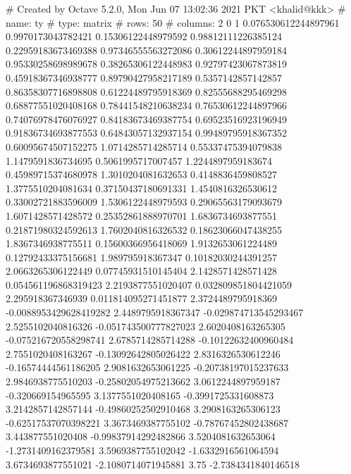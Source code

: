 # Created by Octave 5.2.0, Mon Jun 07 13:02:36 2021 PKT <khalid@kkk>
# name: ty
# type: matrix
# rows: 50
# columns: 2
 0 1
 0.076530612244897961 0.9970173043782421
 0.15306122448979592 0.98812111226385124
 0.22959183673469388 0.97346555563272086
 0.30612244897959184 0.95330258698989678
 0.38265306122448983 0.92797423067873819
 0.45918367346938777 0.89790427958217189
 0.5357142857142857 0.86358307716898808
 0.61224489795918369 0.82555688295469298
 0.68877551020408168 0.78441548210638234
 0.76530612244897966 0.74076978476076927
 0.84183673469387754 0.69523516923196949
 0.91836734693877553 0.64843057132937154
 0.99489795918367352 0.60095674507152275
 1.0714285714285714 0.55337475394079838
 1.1479591836734695 0.5061995717007457
 1.2244897959183674 0.45989715374680978
 1.3010204081632653 0.4148836459808527
 1.3775510204081634 0.37150437180691331
 1.4540816326530612 0.33002721883596009
 1.5306122448979593 0.29065563179093679
 1.6071428571428572 0.25352861888970701
 1.6836734693877551 0.21871980324592613
 1.7602040816326532 0.18623066047438255
 1.8367346938775511 0.15600366956418069
 1.9132653061224489 0.12792433375156681
 1.989795918367347 0.10182030244391257
 2.0663265306122449 0.07745931510145404
 2.1428571428571428 0.054561196868319423
 2.2193877551020407 0.032809851804421059
 2.295918367346939 0.011814095271451877
 2.3724489795918369 -0.0088953429628419282
 2.4489795918367347 -0.029874713545293467
 2.5255102040816326 -0.051743500777827023
 2.6020408163265305 -0.075216720558298741
 2.6785714285714288 -0.10122632400960484
 2.7551020408163267 -0.13092642805026422
 2.8316326530612246 -0.16574444561186205
 2.9081632653061225 -0.20738197015237633
 2.9846938775510203 -0.25802054975213662
 3.0612244897959187 -0.320669154965595
 3.1377551020408165 -0.3991725331608873
 3.2142857142857144 -0.49860252502910468
 3.2908163265306123 -0.62517537070398221
 3.3673469387755102 -0.78767452802438687
 3.443877551020408 -0.99837914292482866
 3.5204081632653064 -1.2731409162379581
 3.5969387755102042 -1.6332916561064594
 3.6734693877551021 -2.1080714071945881
 3.75 -2.7384341840146518



